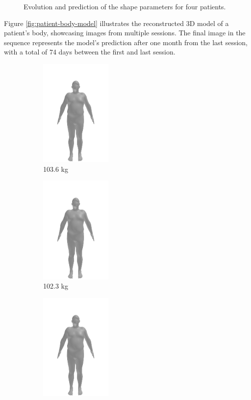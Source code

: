 \begin{figure}[h]
	\caption{Evolution and prediction of the shape parameters for four patients.}
	\label{fig:predicted-betas}
\end{figure}

Figure \ref{fig:patient-body-model} illustrates the reconstructed 3D model of a
patient's body, showcasing images from multiple sessions. The final image in
the sequence represents the model's prediction after one month from the last
session, with a total of 74 days between the first and last session.

\begin{figure}[h]
	\centering
	\begin{subfigure}{0.3\textwidth}
		\centering
		\includegraphics[width=100pt]{files/patients/2_6}
		\caption{103.6 kg}
	\end{subfigure}
	\begin{subfigure}{0.3\textwidth}
		\centering
		\includegraphics[width=100pt]{files/patients/2_7}
		\caption{102.3 kg}
	\end{subfigure}
	\begin{subfigure}{0.3\textwidth}
		\centering
		\includegraphics[width=100pt]{files/patients/2_8}

\end{subfigure}
\end{figure}
